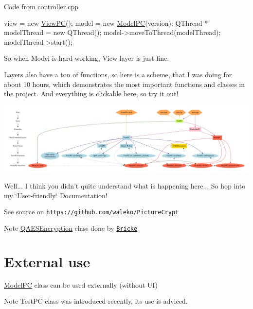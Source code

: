Code from controller.\-cpp 
\begin{DoxyCode}
view = \textcolor{keyword}{new} \hyperlink{class_view_p_c}{ViewPC}();
model = \textcolor{keyword}{new} \hyperlink{class_model_p_c}{ModelPC}(version);
QThread * modelThread = \textcolor{keyword}{new} QThread();
model->moveToThread(modelThread);
modelThread->start();
\end{DoxyCode}
 So when Model is hard-\/working, View layer is just fine.

Layers also have a ton of functions, so here is a scheme, that I was doing for about 10 hours, which demonstrates the most important functions and classes in the project. And everything is clickable here, so try it out! 
\begin{DoxyImageNoCaption}
  \mbox{\includegraphics[width=\textwidth,height=\textheight/2,keepaspectratio=true]{dot_mainpage}}
\end{DoxyImageNoCaption}
 Well... I think you didn't quite understand what is happening here... So hop into my \char`\"{}\-User-\/friendly\char`\"{} Documentation!

See source on \href{https://github.com/waleko/PictureCrypt}{\tt https\-://github.\-com/waleko/\-Picture\-Crypt}

\begin{DoxyNote}{Note}
\hyperlink{class_q_a_e_s_encryption}{Q\-A\-E\-S\-Encryption} class done by \href{https://github.com/bricke}{\tt Bricke}
\end{DoxyNote}
\hypertarget{index_ext-use}{}\section{External use}\label{index_ext-use}
\hyperlink{class_model_p_c}{Model\-P\-C} class can be used externally (without U\-I) \begin{DoxyNote}{Note}
Test\-P\-C class was introduced recently, its use is adviced.
\end{DoxyNote}

